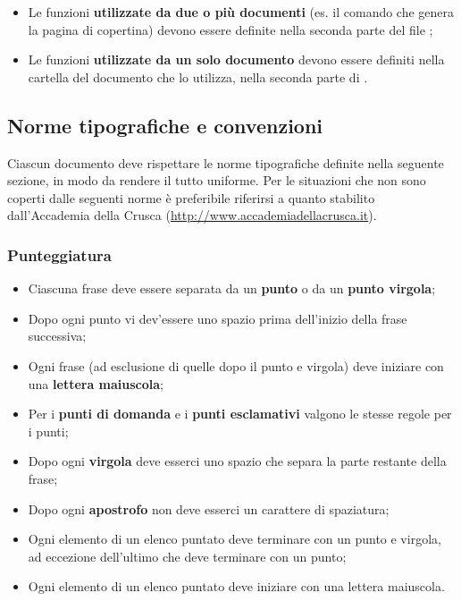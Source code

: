 \begin{itemize}
	\item Le funzioni \textbf{utilizzate da due o più documenti} (es. il comando che genera la pagina di copertina) devono essere definite nella seconda parte del file ;
	
	\item Le funzioni \textbf{utilizzate da un solo documento} devono essere definiti nella cartella del documento che lo utilizza, nella seconda parte di .
\end{itemize}

\subsection{Norme tipografiche e convenzioni}

Ciascun documento deve rispettare le norme tipografiche definite nella seguente sezione, in modo da rendere il tutto uniforme. Per le situazioni che non sono coperti dalle seguenti norme è preferibile riferirsi a quanto stabilito dall'Accademia della Crusca (\url{http://www.accademiadellacrusca.it}).

	\subsubsection{Punteggiatura}
	
	\begin{itemize}

		\item Ciascuna frase deve essere separata da un \textbf{punto} o da un \textbf{punto virgola};
		\item Dopo ogni punto vi dev'essere uno spazio prima dell'inizio della frase successiva;
		\item Ogni frase (ad esclusione di quelle dopo il punto e virgola) deve iniziare con una \textbf{lettera maiuscola};
		\item Per i \textbf{punti di domanda} e i \textbf{punti esclamativi} valgono le stesse regole per i punti;
		\item Dopo ogni \textbf{virgola} deve esserci uno spazio che separa la parte restante della frase;
		\item Dopo ogni \textbf{apostrofo} non deve esserci un carattere di spaziatura;
		\item Ogni elemento di un elenco puntato deve terminare con un punto e virgola, ad eccezione dell'ultimo che deve terminare con un punto;
		\item Ogni elemento di un elenco puntato deve iniziare con una lettera maiuscola.
	
	\end{itemize}
	
